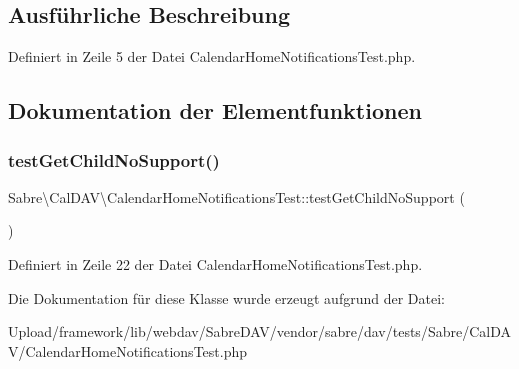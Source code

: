 \subsection{Ausführliche Beschreibung}


Definiert in Zeile 5 der Datei Calendar\+Home\+Notifications\+Test.\+php.



\subsection{Dokumentation der Elementfunktionen}
\mbox{\label{class_sabre_1_1_cal_d_a_v_1_1_calendar_home_notifications_test_ab1a7fd64b00a7dc904d00f5ccbde2ec6}} 
\subsubsection{\texorpdfstring{test\+Get\+Child\+No\+Support()}{testGetChildNoSupport()}}
{\footnotesize\ttfamily Sabre\textbackslash{}\+Cal\+D\+A\+V\textbackslash{}\+Calendar\+Home\+Notifications\+Test\+::test\+Get\+Child\+No\+Support (\begin{DoxyParamCaption}{ }\end{DoxyParamCaption})}



Definiert in Zeile 22 der Datei Calendar\+Home\+Notifications\+Test.\+php.



Die Dokumentation für diese Klasse wurde erzeugt aufgrund der Datei\+:\begin{DoxyCompactItemize}
\item 
Upload/framework/lib/webdav/\+Sabre\+D\+A\+V/vendor/sabre/dav/tests/\+Sabre/\+Cal\+D\+A\+V/Calendar\+Home\+Notifications\+Test.\+php\end{DoxyCompactItemize}
